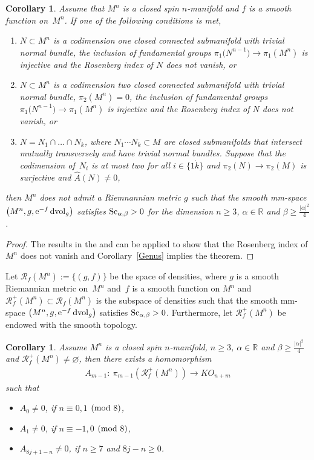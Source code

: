 \documentclass[pdftex]{sigma}
\newtheorem{Corollary}[Theorem]{Corollary}
\begin{document}
\begin{Corollary}Assume that $M^n$ is a closed spin $n$-manifold and $f$ is a smooth function on~$M^n$. If one of the following conditions is met,
\begin{enumerate}\itemsep=0pt
\item[$(1)$] $N \subset M^n$ is a codimension one closed connected submanifold with trivial normal bundle, the inclusion of fundamental groups $\pi_1\big(N^{n-1}\big)\rightarrow\pi_1(M^n)$ is injective and the Rosenberg index of $N$ does not vanish, or
\item[$(2)$] $N\subset M^n$ is a codimension two closed connected submanifold with trivial normal bundle, $\pi_2(M^n)=0$, the inclusion of fundamental groups $\pi_1\big(N^{n-1}\big)\rightarrow\pi_1(M^n)$ is injective and the Rosenberg index of $N$ does not vanish, or
\item[$(3)$] $N=N_1\cap \dots \cap N_k$, where $N_1 \cdots N_k\subset M$ are closed submanifolds that intersect mutually transversely and have trivial normal bundles. Suppose that the codimension of~$N_i$ is at most two for all $i\in \{1\dot k \}$ and $\pi_2(N) \rightarrow \pi_2(M)$ is surjective and $\hat{A}(N)\neq 0$,
\end{enumerate}
 then $M^n$ does not admit a Riemnannian metric $g$ such that the smooth mm-space $\big(M^n, g, \allowbreak {\rm e}^{-f}\,{\rm dvol}_g\big)$ satisfies ${\rm Sc}_{\alpha, \beta}> 0$ for the dimension $n\geq 3$, $\alpha \in \mathbb{R}$ and $\beta \geq \frac{|\alpha|^2}{4}$.
\end{Corollary}

\begin{proof}The results in the \cite[Theorem~1.1]{MR3449594} and \cite[Theorem~1.9]{MR3704253} can be applied to show that the Rosenberg index of $M^n$ does not vanish and Corollary~\ref{Genus} implies the theorem.
\end{proof}

Let $\mathcal{R}_f(M^n):=\{(g,f)\}$ be the space of densities, where $g$ is a smooth Riemannian metric on~$M^n$ and~$f$ is a smooth function on $M^n$ and $\mathcal{R}^+_f(M^n)\subset \mathcal{R}_f(M^n)$ is the subspace of densities such that the smooth mm-space $\big(M^n, g, {\rm e}^{-f}\,{\rm dvol}_g\big)$ satisfies ${\rm Sc}_{\alpha, \beta}> 0$. Furthermore, let $\mathcal{R}^+_f(M^n)$ be endowed with the smooth topology.

\begin{Corollary}Assume $M^n$ is a closed spin $n$-manifold, $n\geq 3$, $\alpha \in \mathbb{R}$ and $\beta \geq \frac{|\alpha|^2}{4}$ and $\mathcal{R}^+_f(M^n)\neq \varnothing$, then there exists a homomorphism
\begin{gather*}
A_{m-1}\colon \ \pi_{m-1}(\mathcal{R}^+_f(M^n))\to KO_{n+m}
\end{gather*}
such that
\begin{itemize}\itemsep=0pt
\item $A_0\neq 0$, if $n\equiv 0,1$ $({\rm mod}~8)$,
\item $A_1\neq 0$, if $n\equiv -1,0$ $({\rm mod}~8)$,
\item $A_{8j+1-n}\neq 0$, if $n\geq 7$ and $8j-n\geq 0$.
\end{itemize}
\end{Corollary}
\end{document}
